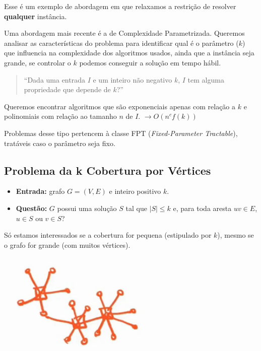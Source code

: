 Esse é um exemplo de abordagem em que relaxamos a restrição de resolver \textbf{qualquer} instância.

Uma abordagem mais recente é a de Complexidade Parametrizada. Queremos analisar as características do problema para identificar qual é o parâmetro ($k$) que influencia na complexidade dos algoritmos usados, ainda que a instância seja grande, se controlar o $k$ podemos conseguir a solução em tempo hábil.

\begin{quote}
	``Dada uma entrada $I$ e um inteiro não negativo $k$, $I$ tem alguma propriedade que depende de $k$?''
\end{quote}

Queremos encontrar algoritmos que são exponenciais apenas com relação a $k$ e polinomiais com relação ao tamanho $n$ de $I$. $\rightarrow O(n^cf(k))$

Problemas desse tipo pertencem à classe FPT (\textit{Fixed-Parameter Tractable}), tratáveis caso o parâmetro seja fixo.

\subsection{Problema da k Cobertura por Vértices}

\begin{itemize}
	\item \textbf{Entrada:} grafo $G=(V, E)$ e inteiro positivo $k$.
	\item \textbf{Questão:} $G$ possui uma solução $S$ tal que $|S| \leq k$ e, para toda aresta $uv \in E$, $u \in S$ ou $v \in S$?
\end{itemize}

Só estamos interessados se a cobertura for pequena (estipulado por $k$), mesmo se o grafo for grande (com muitos vértices).

\begin{example}
	\centering
	\includegraphics[scale=.75]{img/ex_k_cobertura_pequena.png}
\end{example}

